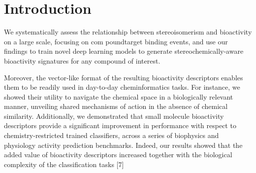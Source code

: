 \chapter{Introduction}
\label{introduction}
\newpage




\makeatletter
\newenvironment{figurehere}
{\def\@captype{figure}}
{}
\makeatother

\makeatletter
\newenvironment{Figure_modified}{%
\par\addvspace{12pt plus2pt}%
\def\@captype{figure}%
}{%
\par\addvspace{12pt plus2pt}%
}%

\long{}
\makeatother





We systematically assess the relationship between stereoisomerism and bioactivity on a large scale, focusing on com poundtarget binding events, and use our findings to train novel deep learning models to generate stereochemically-aware bioactivity signatures for any compound of interest.

Moreover, the vector-like format of the resulting bioactivity descriptors enables them to be readily used in day-to-day cheminformatics tasks. For instance, we showed their utility to navigate the chemical space in a biologically relevant manner, unveiling shared mechanisms of action in the absence of chemical similarity. Additionally, we demonstrated that small molecule bioactivity descriptors provide a significant improvement in performance with respect to chemistry-restricted trained classifiers, across a series of biophysics and physiology activity prediction benchmarks. Indeed, our results showed that the added value of bioactivity descriptors increased together with the biological complexity of the classification tasks [7]